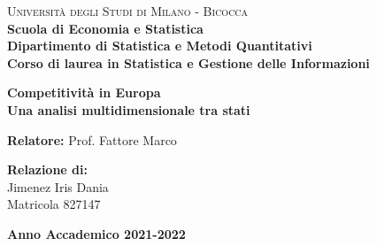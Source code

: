 \documentclass[a4paper,12pt, openright]{report}
\begin{document}
    
\begin{titlepage}
    \noindent
    \begin{minipage}[t]{0.19\textwidth}
    \end{minipage}
    \begin{minipage}[t]{0.81\textwidth}
        \textsc{Università degli Studi di Milano - Bicocca} \\
        \textbf{Scuola di Economia e Statistica} \\
        \textbf{Dipartimento di Statistica e Metodi Quantitativi} \\
        \textbf{Corso di laurea in Statistica e Gestione delle Informazioni} \\
        \par
    \end{minipage}
    \vspace{40mm}
    \begin{center}
        \large {}
        \textbf{Competitività in Europa \\ Una analisi multidimensionale tra stati}
        \par
    \end{center}
    \vspace{50mm}
    \noindent
    {\large \textbf{Relatore:} Prof. Fattore Marco} \\
    \vspace{15mm}
    \begin{flushright}
        {\large \textbf{Relazione di:}} \\
        \large{Jimenez Iris Dania} \\
        \large{Matricola 827147}
    \end{flushright}
    \vspace{40mm}
    \begin{center}
        {\large{\bf Anno Accademico 2021-2022}}
    \end{center}
    \restoregeometry
\end{titlepage}
\end{document}
